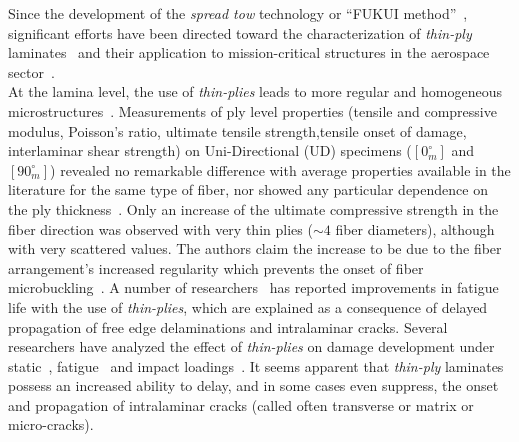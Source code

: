 \documentclass[Review,sagev,times]{sagej}
\begin{document}
Since the development of the \emph{spread tow} technology or ``FUKUI method''~\cite{Kawabe2008}, significant efforts have been directed toward the characterization of \emph{thin-ply} laminates~\cite{Yamaguchi2005,Sihn2007,Yokozeki2008,Yokozeki2010,Saito2012,Arteiro2013,Arteiro2014,Amacher2014,Guillamet2014,Cugnoni2018} and their application to mission-critical structures in the aerospace sector~\cite{Kopp2017}.\\%
At the lamina level, the use of \emph{thin-plies} leads to more regular and homogeneous microstructures~\cite{Saito2012,Amacher2014}. Measurements of ply level properties (tensile and compressive modulus, Poisson's ratio, ultimate tensile strength,tensile onset of damage, interlaminar shear strength) on Uni-Directional (UD) specimens ($\left[0_{m}^{\circ}\right]$ and $\left[90_{m}^{\circ}\right]$) revealed no remarkable difference with average properties available in the literature for the same type of fiber, nor showed any particular dependence on the ply thickness~\cite{Amacher2014}. Only an increase of the ultimate compressive strength in the fiber direction was observed with very thin plies ($\sim4$ fiber diameters), although with very scattered values. The authors claim the increase to be due to the fiber arrangement's increased regularity which prevents the onset of fiber microbuckling~\cite{Amacher2014}. A number of researchers~\cite{Yamaguchi2005,Sihn2007,Yokozeki2008} has reported improvements in fatigue life with the use of \emph{thin-plies}, which are explained as a consequence of delayed propagation of free edge delaminations and intralaminar cracks. Several researchers have analyzed the effect of \emph{thin-plies} on damage development under static~\cite{Sihn2007,Yokozeki2008,Yokozeki2010,Saito2012,Arteiro2013,Arteiro2014,Amacher2014}, fatigue~\cite{Yamaguchi2005,Sihn2007,Yokozeki2008,Yokozeki2010,Amacher2014} and impact loadings~\cite{Sihn2007,Yokozeki2008,Yokozeki2010,Amacher2014}. It seems apparent that \emph{thin-ply} laminates possess an increased ability to delay, and in some cases even suppress, the onset and propagation of intralaminar cracks (called often transverse or matrix or micro-cracks).\\
\end{document}
